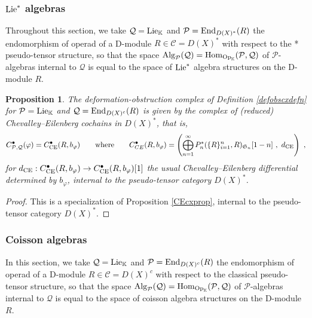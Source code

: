 \documentclass[11pt]{amsart}
\numberwithin{equation}{section}
\newtheorem{prop}[theo]{Proposition}
\theoremstyle{definition}
\newcommand{\bb}{\mathbb}
\newcommand{\mc}{\mathcal}
\newcommand{\mf}{\mathfrak}
\DeclareMathOperator{\Hom}{Hom}
\newcommand{\K}{{\bb K}}
\newcommand{\End}{{\textup{End}}}
\newcommand{\CE}{{\textup{CE}}}
\newcommand{\Alg}{{\textup{Alg}}}
\newcommand{\Lie}{{\textup{Lie}}}
\newcommand{\Op}{{\textup{Op}}}
\newcommand{\Ss}{{{\mf{S}}}}
\newcommand{\0}{{\textbf{0}}}
\newcommand{\DD}{{D}}
\def \mf{\mathfrak}
\def \Op{\mathrm{Op}}
\begin{document}
\fi



\subsubsection{\texorpdfstring{$\Lie^*$}{Lie*} algebras}

Throughout this section, we take $\mc Q=\Lie_\K$ and $\mc P=\End_{\DD(X)^*}(R)$ the endomorphism of operad of a D-module $R\in \mc C = \DD(X)^*$ with respect to the * pseudo-tensor structure, so that the space $\Alg_{\mc P}(\mc Q)=\Hom_{\Op_\K}(\mc P,\mc Q)$ of $\mc P$-algebras internal to $\mc Q$ is equal to the space of $\Lie^*$ algebra structures on the D-module $R$.

\begin{prop}\label{chPoiscxprop}
	The deformation-obstruction complex of Definition \ref{defobscxdefn} for $\mc P=\Lie_\K$ and $\mc Q=\End_{\DD(X)^c}(R)$ is given by the complex of (reduced) Chevalley--Eilenberg cochains in $\DD(X)^*$, that is,
	\[ 
	C^\bullet_{\mc P,\mc Q}(\varphi) = C^\bullet_{\CE}(R,b_\varphi) \qquad \text{where}\qquad C^\bullet_{CE}(R,b_\varphi) = \left( \bigoplus_{n=1}^\infty   P_n^*(\{ R\}_{i=1}^n,R)_{\Ss_n}[1-n] \ , \ d_\text{CE} \right)  \ , 
	\]
for $d_\CE:C^\bullet_{\CE}(R,b_\varphi)\to C^\bullet_{\CE}(R,b_\varphi)[1]$ the usual Chevalley--Eilenberg differential determined by $b_\varphi$, internal to the pseudo-tensor category $\DD(X)^*$.
\end{prop}
\begin{proof}
This is a specialization of Proposition \ref{CEcxprop}, internal to the pseudo-tensor category $\DD(X)^*$.
\end{proof}


\subsubsection{Coisson algebras}\label{Coisdefsec}

In this section, we take $\mc Q=\Lie_\K$ and $\mc P=\End_{\DD(X)^c}(R)$ the endomorphism of operad of a D-module $R\in \mc C = \DD(X)^c$ with respect to the classical pseudo-tensor structure, so that the space $\Alg_{\mc P}(\mc Q)=\Hom_{\Op_\K}(\mc P,\mc Q)$ of $\mc P$-algebras internal to $\mc Q$ is equal to the space of coisson algebra structures on the D-module $R$.
\end{document}
